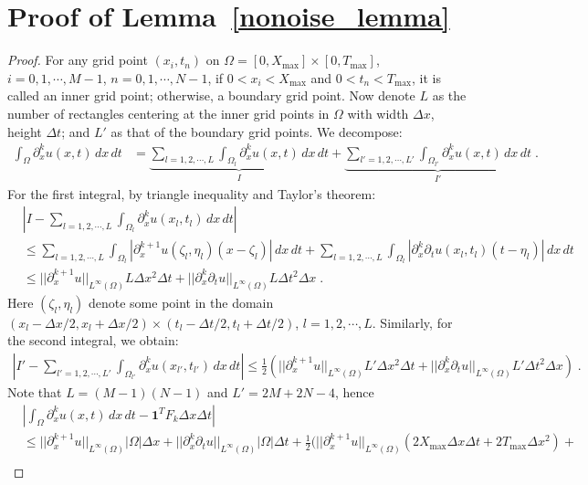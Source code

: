 \documentclass[a4paper,11pt]{article}
\begin{document}
\section{Proof of Lemma~\ref{nonoise_lemma}}\label{proof_nonoise_lemma}
\begin{proof}
For any grid point $(x_i,t_n)$ on $\Omega=[0,X_{\max}]\times[0,T_{\max}]$, $i=0,1,\cdots,M-1$, $n=0,1,\cdots,N-1$, if $0<x_i<X_{\max}$ and $0<t_n<T_{\max}$, it is called an inner grid point; otherwise, a boundary grid point. Now denote $L$ as the number of rectangles centering at the inner grid points in $\Omega$ with width $\Delta x$, height $\Delta t$; and $L'$ as that of the boundary grid points. We decompose:
\begin{align*}
\int_\Omega \partial_x^ku(x,t)\,dx\,dt&=\underbrace{\sum_{l=1,2,\cdots,L}\int_{\Omega_l}\partial_x^ku(x,t)\,dx\,dt}_{I}+\underbrace{\sum_{l'=1,2,\cdots,L'}\int_{\Omega_{l'}}\partial_x^ku(x,t)\,dx\,dt}_{I'}\;.
\end{align*}
For the first integral, by triangle inequality and Taylor's theorem:
\begin{align*}
&|I-\sum_{l=1,2,\cdots,L}\int_{\Omega_l}\partial_x^ku(x_l,t_l)\,dx\,dt|\\&\leq\sum_{l=1,2,\cdots,L}\int_{\Omega_l}|\partial_x^{k+1}u(\zeta_l,\eta_l)(x-\zeta_l)|\,dx\,dt+\sum_{l=1,2,\cdots,L}\int_{\Omega_l}|\partial_x^k\partial_tu(x_l,t_l)(t-\eta_l)|\,dx\,dt\\
&\leq ||\partial_x^{k+1}u||_{L^\infty(\Omega)}L\Delta x^2\Delta t+||\partial_x^{k}\partial_tu||_{L^\infty(\Omega)}L\Delta t^2\Delta x\;.
\end{align*}
Here $(\zeta_l,\eta_l)$ denote some point in the domain $(x_l-\Delta x/2,x_l+\Delta x/2)\times (t_l-\Delta t/2,t_l+\Delta t/2)$, $l=1,2,\cdots,L$. Similarly, for the second integral, we obtain:
\begin{align*}
|I'-\sum_{l'=1,2,\cdots,L'}\int_{\Omega_{l'}}\partial_x^ku(x_{l'},t_{l'})\,dx\,dt|\leq \frac{1}{2}(||\partial_x^{k+1}u||_{L^\infty(\Omega)}L'\Delta x^2\Delta t+||\partial_x^{k}\partial_tu||_{L^\infty(\Omega)}L'\Delta t^2\Delta x)	\;.
\end{align*}
Note that $L=(M-1)(N-1)$ and $L'=2M+2N-4$, hence
\begin{align*}
&|\int_\Omega\partial_x^ku(x,t)\,dx\,dt-\mathbf{1}^TF_k\Delta x\Delta t|\\
&\leq ||\partial_x^{k+1}u||_{L^\infty(\Omega)}|\Omega|\Delta x+||\partial_x^{k}\partial_tu||_{L^\infty(\Omega)}|\Omega|\Delta t+\frac{1}{2}(||\partial_x^{k+1}u||_{L^\infty(\Omega)}(2X_{\max}\Delta x\Delta t+2T_{\max}\Delta x^2 )+\\

\end{align*}
\end{proof}
\end{document}
